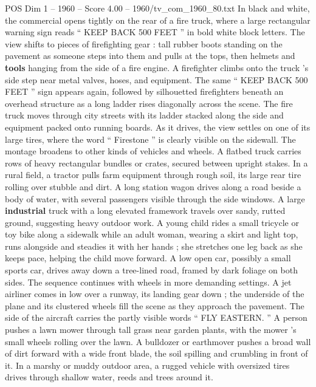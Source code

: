 \begin{textsample}{POS Dim 1 – 1960 – Score 4.00 – 1960/tv\_com\_1960\_80.txt}  \label{ex:f1_pos_080}
In black and white, the commercial opens tightly on the rear of a fire truck, where a large rectangular warning sign reads “ KEEP BACK 500 FEET ” in bold white block letters.
The view shifts to pieces of firefighting gear : tall rubber boots standing on the pavement as someone steps into them and pulls at the tops, then helmets and \textbf{tools} hanging from the side of a fire engine.
A firefighter climbs onto the truck ’s side step near metal valves, hoses, and equipment.
The same “ KEEP BACK 500 FEET ” sign appears again, followed by silhouetted firefighters beneath an overhead structure as a long ladder rises diagonally across the scene.
The fire truck moves through city streets with its ladder stacked along the side and equipment packed onto running boards.
As it drives, the view settles on one of its large tires, where the word “ Firestone ” is clearly visible on the sidewall.
The montage broadens to other kinds of vehicles and wheels.
A flatbed truck carries rows of heavy rectangular bundles or crates, secured between upright stakes.
In a rural field, a tractor pulls farm equipment through rough soil, its large rear tire rolling over stubble and dirt.
A long station wagon drives along a road beside a body of water, with several passengers visible through the side windows.
A large \textbf{industrial} truck with a long elevated framework travels over sandy, rutted ground, suggesting heavy outdoor work.
A young child rides a small tricycle or toy bike along a sidewalk while an adult woman, wearing a skirt and light top, runs alongside and steadies it with her hands ; she stretches one leg back as she keeps pace, helping the child move forward.
A low open car, possibly a small sports car, drives away down a tree-lined road, framed by dark foliage on both sides.
The sequence continues with wheels in more demanding settings.
A jet airliner comes in low over a runway, its landing gear down ; the underside of the plane and its clustered wheels fill the scene as they approach the pavement.
The side of the aircraft carries the partly visible words “ FLY EASTERN. ” A person pushes a lawn mower through tall grass near garden plants, with the mower ’s small wheels rolling over the lawn.
A bulldozer or earthmover pushes a broad wall of dirt forward with a wide front blade, the soil spilling and crumbling in front of it.
In a marshy or muddy outdoor area, a rugged vehicle with oversized tires drives through shallow water, reeds and trees around it.

\end{textsample}

